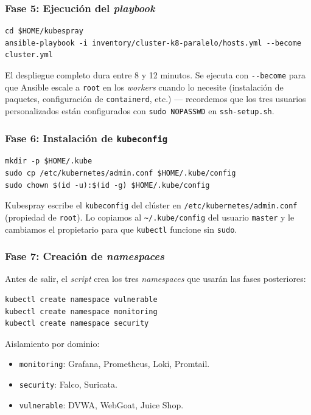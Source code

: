 \subsubsection{Fase 5: Ejecución del \emph{playbook}}

\begin{lstlisting}[style=bash]
cd $HOME/kubespray
ansible-playbook -i inventory/cluster-k8-paralelo/hosts.yml --become cluster.yml
\end{lstlisting}

El despliegue completo dura entre 8 y 12 minutos. Se ejecuta con \texttt{-{}-become} para que Ansible escale a \texttt{root} en los \emph{workers} cuando lo necesite (instalación de paquetes, configuración de \texttt{containerd}, etc.) --- recordemos que los tres usuarios personalizados están configurados con \texttt{sudo NOPASSWD} en \texttt{ssh-setup.sh}.

\subsubsection{Fase 6: Instalación de \texttt{kubeconfig}}

\begin{lstlisting}[style=bash]
mkdir -p $HOME/.kube
sudo cp /etc/kubernetes/admin.conf $HOME/.kube/config
sudo chown $(id -u):$(id -g) $HOME/.kube/config
\end{lstlisting}

Kubespray escribe el \texttt{kubeconfig} del clúster en \texttt{/etc/kubernetes/admin.conf} (propiedad de \texttt{root}). Lo copiamos al \texttt{\textasciitilde/.kube/config} del usuario \texttt{master} y le cambiamos el propietario para que \texttt{kubectl} funcione sin \texttt{sudo}.

\subsubsection{Fase 7: Creación de \emph{namespaces}}

Antes de salir, el \emph{script} crea los tres \emph{namespaces} que usarán las fases posteriores:

\begin{lstlisting}[style=bash]
kubectl create namespace vulnerable
kubectl create namespace monitoring
kubectl create namespace security
\end{lstlisting}

Aislamiento por dominio:
\begin{itemize}
  \item \texttt{monitoring}: Grafana, Prometheus, Loki, Promtail.
  \item \texttt{security}: Falco, Suricata.
  \item \texttt{vulnerable}: DVWA, WebGoat, Juice Shop.
\end{itemize}

